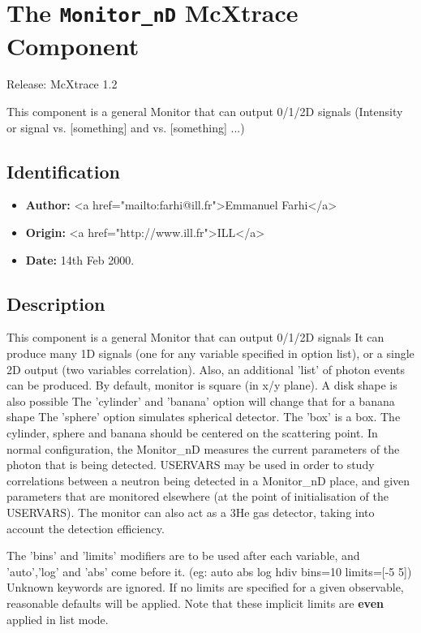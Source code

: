 \section{The \texttt{Monitor\_nD} McXtrace Component}
Release: McXtrace 1.2

This component is a general Monitor that can output 0/1/2D signals
(Intensity or signal vs. [something] and vs. [something] ...)

\subsection*{Identification}
\begin{itemize}
  \item \textbf{Author:} \textless{}a href="mailto:farhi@ill.fr"\textgreater{}Emmanuel Farhi\textless{}/a\textgreater{}
  \item \textbf{Origin:} \textless{}a href="http://www.ill.fr"\textgreater{}ILL\textless{}/a\textgreater{}
  \item \textbf{Date:} 14th Feb 2000.
\end{itemize}

\subsection*{Description}
This component is a general Monitor that can output 0/1/2D signals It can produce many 1D signals (one for any variable specified in option list), or a single 2D output (two variables correlation). Also, an additional 'list' of photon events can be produced. By default, monitor is square (in x/y plane). A disk shape is also possible The 'cylinder' and 'banana' option will change that for a banana shape The 'sphere' option simulates spherical detector. The 'box' is a box. The cylinder, sphere and banana should be centered on the scattering point. In normal configuration, the Monitor\_nD measures the current parameters of the photon that is being detected. USERVARS may be used in order to study correlations between a neutron being detected in a Monitor\_nD place, and given parameters that are monitored elsewhere (at the point of initialisation of the USERVARS). The monitor can also act as a 3He gas detector, taking into account the detection efficiency.

The 'bins' and 'limits' modifiers are to be used after each variable, and 'auto','log' and 'abs' come before it. (eg: auto abs log hdiv bins=10 limits=[-5 5]) Unknown keywords are ignored. If no limits are specified for a given observable, reasonable defaults will be applied. Note that these implicit limits are \textbf{even} applied in list mode.

